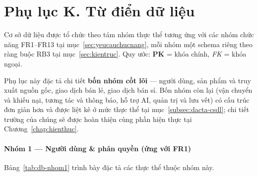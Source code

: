 
\section*{Phụ lục K. Từ điển dữ liệu}
\label{apdx:tudien}


Cơ sở dữ liệu được tổ chức theo tám nhóm thực thể tương ứng với các nhóm chức
năng FR1--FR13 tại mục~\ref{sec:yeucauchucnang}, mỗi nhóm một schema riêng theo
ràng buộc RB3 tại mục~\ref{sec:kientruc}. Quy ước: \textbf{PK} = khóa chính,
\textit{FK} = khóa ngoại.

Phụ lục này đặc tả chi tiết \textbf{bốn nhóm cốt lõi} --- người dùng, sản phẩm
và truy xuất nguồn gốc, giao dịch bán lẻ, giao dịch bán sỉ. Bốn nhóm còn lại
(vận chuyển và khiếu nại, tương tác và thông báo, hỗ trợ AI, quản trị và lưu
vết) có cấu trúc đơn giản hơn và được liệt kê ở mức thực thể tại
mục~\ref{subsec:dacta-csdl}; chi tiết trường của chúng sẽ được hoàn thiện cùng
phần hiện thực tại Chương~\ref{chap:hienthuc}.
 
\paragraph*{Nhóm 1 --- Người dùng \& phân quyền (ứng với FR1)}

\noindent Bảng~\ref{tab:db-nhom1} trình bày đặc tả các thực thể thuộc nhóm này.
 
